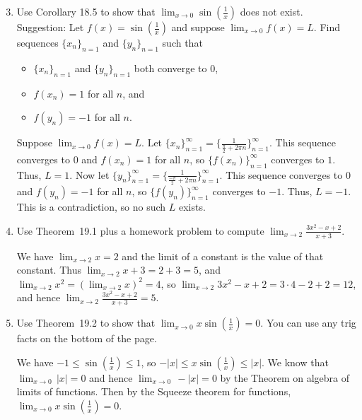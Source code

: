 \documentclass[12pt]{amsart}
\def\ds{\displaystyle}
\numberwithin{equation}{section}
\theoremstyle{plain} %
\theoremstyle{definition}
\theoremstyle{remark}
\begin{document}
\begin{enumerate} \setcounter{enumi}{2}

\item Use Corollary 18.5 to show that $\ds \lim_{x\to 0} \sin\left(\frac{1}{x}\right)$ does not exist.\\
Suggestion: Let $f(x)= \sin(\frac{1}{x})$ and suppose $\lim_{x\to 0} f(x) = L$. Find sequences $\{x_n\}_{n=1}$  and $\{y_n\}_{n=1}$ such that
\begin{itemize}
\item  $\{x_n\}_{n=1}$ and $\{y_n\}_{n=1}$ both converge to $0$,
\item $f(x_n)=1$ for all $n$, and
\item $f(y_n)=-1$ for all $n$.
\end{itemize}


\begin{framed}
Suppose $\lim_{x\to 0} f(x) = L$. Let $\{x_n\}_{n=1}^\infty = \{ \frac{1}{\frac{\pi}{2} + 2\pi n}\}_{n=1}^\infty$. This sequence converges to $0$ and $f(x_n)=1$ for all $n$, so $\{f(x_n)\}_{n=1}^\infty$ converges to $1$. Thus, $L=1$. Now let $\{y_n\}_{n=1}^\infty = \{ \frac{1}{\frac{-\pi}{2} + 2\pi n}\}_{n=1}^\infty$. This sequence converges to $0$ and $f(y_n)=-1$ for all $n$, so $\{f(y_n)\}_{n=1}^\infty$ converges to $-1$. Thus, $L=-1$. This is a contradiction, so no such $L$ exists.
\end{framed}

\item Use Theorem~19.1 plus a homework problem  to compute $\ds \lim_{x\to 2} \frac{3x^2 - x +2}{x+3}$.

\begin{framed}
We have $\lim_{x\to 2} x= 2$ and the limit of a constant is the value of that constant. Thus $\lim_{x\to 2} x+3 = 2+3 = 5$, and $\lim_{x\to 2} x^2 = (\lim_{x\to 2} x)^2 = 4$, so $\lim_{x\to 2} 3x^2 - x +2 = 3 \cdot 4 - 2 + 2 = 12$, and hence $\ds \lim_{x\to 2} \frac{3x^2 - x +2}{x+3}=5$.
\end{framed}

\item Use Theorem~19.2 to show that $\displaystyle \lim_{x\to 0} x \sin\left(\frac{1}{x}\right)=0$. You can use any trig facts on the bottom of the page.

\begin{framed}
We have $-1\leq  \sin\left(\frac{1}{x}\right) \leq 1$, so $-|x| \leq x \sin\left(\frac{1}{x}\right) \leq |x|$. We know that $\lim_{x\to 0} \, |x| = 0$ and hence $\lim_{x\to 0} \, -|x| = 0$ by the Theorem on algebra of limits of functions. Then by the Squeeze theorem for functions, $\displaystyle \lim_{x\to 0} x \sin\left(\frac{1}{x}\right)=0$.
\end{framed}



\end{enumerate}
\end{document}
